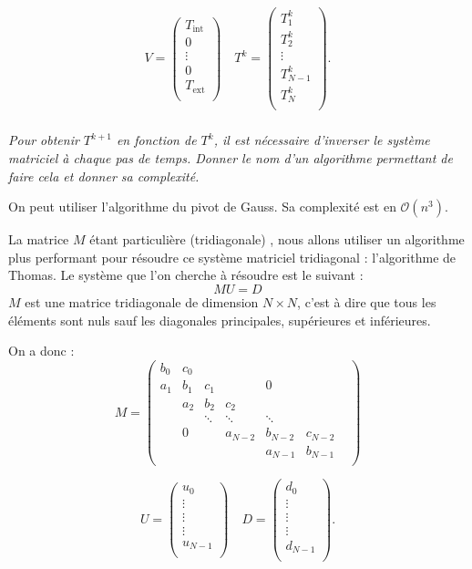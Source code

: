 \documentclass[10pt,fleqn]{article} %
\begin{document}
\begin{multicols}{2}
$$ 
V = \begin{pmatrix}
T_{\text{int}} \\
0 \\
\vdots \\
0 \\
T_{\text{ext}} \\
\end{pmatrix}
\quad
T^k = \begin{pmatrix}
T_1^k \\
T_2^k  \\
\vdots \\
T_{N-1}^k  \\
T_N^k \\
\end{pmatrix}.
$$

\fi


\subparagraph{}
\textit{Pour obtenir $T^{k+1}$ en fonction de $T^{k}$, il est nécessaire d'inverser le 
système matriciel à chaque pas de temps.
Donner le nom d'un algorithme permettant de faire cela et donner sa complexité.}

\ifprof
\begin{corrige}
On peut utiliser l'algorithme du pivot de Gauss. Sa complexité est en $\mathcal{O}(n^3)$.
\end{corrige}
\else
\fi

\ifprof
\else

\begin{obj}
La matrice $M$ étant particulière (tridiagonale) , nous allons utiliser un algorithme plus 
performant pour résoudre ce système matriciel tridiagonal : l'algorithme de Thomas.
 Le système que l'on cherche à résoudre est le suivant : 
$$
M U = D 
$$
$M$ est une matrice tridiagonale de dimension $N\times N$, c'est à dire que tous les éléments 
sont nuls sauf les diagonales principales, supérieures et inférieures. 
\end{obj}

On a donc : 
$$
M = 
\begin{pmatrix}
b_0 & c_0 &  &  &  &  & \\
a_1 & b_1 & c_1 & &0 & &\\
      & a_2 & b_2 & c_2 & & & \\
& & \ddots & \ddots & \ddots & \\
& 0& & a_{N-2} & b_{N-2} & c_{N-2}\\
& & & & a_{N-1} & b_{N-1}\\
\end{pmatrix}
$$

$$
U = \begin{pmatrix}
u_0 \\
\vdots \\
\vdots \\
\vdots  \\
u_{N-1} \\
\end{pmatrix}
\quad 
D = \begin{pmatrix}
d_0 \\
\vdots \\
\vdots \\
\vdots  \\
d_{N-1} \\
\end{pmatrix}.
$$


\end{multicols}
\end{document}
